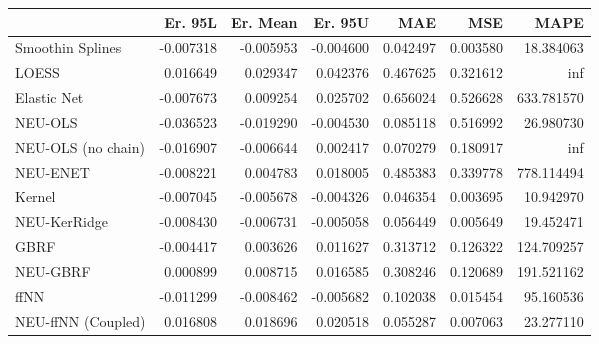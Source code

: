 \begin{tabular}{lrrrrrr}
\toprule
{} &   Er. 95L &  Er. Mean &   Er. 95U &       MAE &       MSE &        MAPE \\
\midrule
Smoothin Splines   & -0.007318 & -0.005953 & -0.004600 &  0.042497 &  0.003580 &   18.384063 \\
LOESS              &  0.016649 &  0.029347 &  0.042376 &  0.467625 &  0.321612 &         inf \\
Elastic Net        & -0.007673 &  0.009254 &  0.025702 &  0.656024 &  0.526628 &  633.781570 \\
NEU-OLS            & -0.036523 & -0.019290 & -0.004530 &  0.085118 &  0.516992 &   26.980730 \\
NEU-OLS (no chain) & -0.016907 & -0.006644 &  0.002417 &  0.070279 &  0.180917 &         inf \\
NEU-ENET           & -0.008221 &  0.004783 &  0.018005 &  0.485383 &  0.339778 &  778.114494 \\
Kernel             & -0.007045 & -0.005678 & -0.004326 &  0.046354 &  0.003695 &   10.942970 \\
NEU-KerRidge       & -0.008430 & -0.006731 & -0.005058 &  0.056449 &  0.005649 &   19.452471 \\
GBRF               & -0.004417 &  0.003626 &  0.011627 &  0.313712 &  0.126322 &  124.709257 \\
NEU-GBRF           &  0.000899 &  0.008715 &  0.016585 &  0.308246 &  0.120689 &  191.521162 \\
ffNN               & -0.011299 & -0.008462 & -0.005682 &  0.102038 &  0.015454 &   95.160536 \\
NEU-ffNN (Coupled) &  0.016808 &  0.018696 &  0.020518 &  0.055287 &  0.007063 &   23.277110 \\
\bottomrule
\end{tabular}
